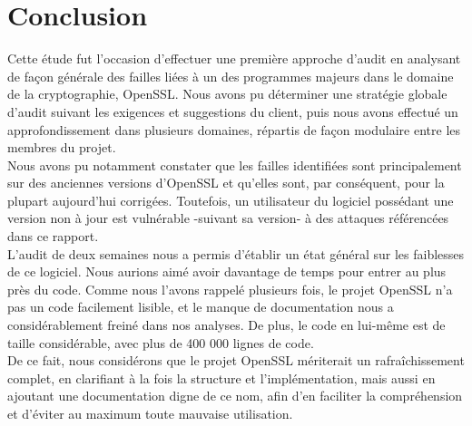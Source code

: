 \section*{Conclusion}

Cette étude fut l'occasion d'effectuer une première approche d'audit en analysant de façon générale des failles liées à un des programmes majeurs dans le domaine de la cryptographie, OpenSSL. Nous avons pu déterminer une stratégie globale d'audit suivant les exigences et suggestions du client, puis nous avons effectué un approfondissement dans plusieurs domaines, répartis de façon modulaire entre les membres du projet.\\


Nous avons pu notamment constater que les failles identifiées sont principalement sur des anciennes versions d'OpenSSL et qu'elles sont, par conséquent, pour la plupart aujourd'hui corrigées. Toutefois, un utilisateur du logiciel possédant une version non à jour est vulnérable -suivant sa version- à des attaques référencées dans ce rapport. \\


L'audit de deux semaines nous a permis d'établir un état général sur les faiblesses de ce logiciel. Nous aurions aimé avoir davantage de temps pour entrer au plus près du code. Comme nous l'avons rappelé plusieurs fois, le projet OpenSSL n'a pas un code facilement lisible, et le manque de documentation nous a considérablement freiné dans nos analyses. De plus, le code en lui-même est de taille considérable, avec plus de 400 000 lignes de code.\\


De ce fait, nous considérons que le projet OpenSSL mériterait un rafraîchissement complet, en clarifiant à la fois la structure et l'implémentation, mais aussi en ajoutant une documentation digne de ce nom, afin d'en faciliter la compréhension et d'éviter au maximum toute mauvaise utilisation.  















